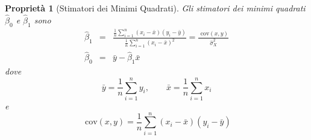\documentclass[
  11pt,
]{book}
\theoremstyle{mytheoremstyle}
\newtheorem{proposition}{Proprietà}[section]
\theoremstyle{mydefstyle}
\begin{document}
\begin{info}

\begin{proposition}[Stimatori dei Minimi Quadrati]
Gli stimatori dei minimi quadrati \(\hat\beta_0\) e \(\hat\beta_1\) sono
\begin{eqnarray*}
\hat\beta_1 &=& \frac{\frac 1 n\sum_{i=1}^n{(x_i-\bar x)(y_i-\bar y)}}{\frac 1 n\sum_{i=1}^n(x_i-\bar x)^2}=\frac{\text{ cov}(x,y)}{\hat\sigma^2_X}\\
\hat\beta_0 &=&\bar y -\hat\beta_1\bar x
\end{eqnarray*}
dove
\[\bar y = \frac 1 n\sum_{i=1}^n y_i,\qquad \bar x=\frac 1 n \sum_{i=1}^n x_i\]
e
\[
\text{ cov}(x,y) = \frac 1 n\sum_{i=1}^n(x_i-\bar x)(y_i-\bar y)
\]
\end{proposition}

\end{info}
\end{document}
